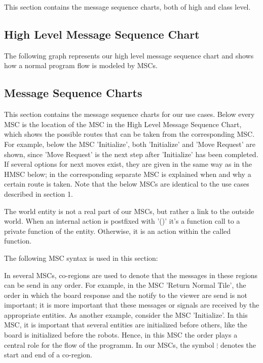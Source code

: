 This section contains the message sequence charts, both of high and class level.
\subsection{High Level Message Sequence Chart}
	
	\begin{minipage}{\linewidth}
		The following graph represents our high level message sequence chart and shows how a normal program flow is modeled by MSCs.
		
			
	\end{minipage}
	\newpage
\subsection{Message Sequence Charts}
	This section contains the message sequence charts for our use cases. Below every MSC is the location of the MSC in the High Level Message Sequence Chart, which shows the possible routes that can be taken from the corresponding MSC. For example, below the MSC 'Initialize', both 'Initialize' and 'Move Request' are shown, since 'Move Request' is the next step after 'Initialize' has been completed. If several options for next moves exist, they are given in the same way as in the HMSC below; in the corresponding separate MSC is explained when and why a certain route is taken. Note that the below MSCs are identical to the use cases described in section 1.

	The world entity is not a real part of our MSCs, but rather a link to the outside world. When an internal action is postfixed with '()' it's a function call to a private function of the entity. Otherwise, it is an action within the called function.

	The following MSC syntax is used in this section:

	

	In several MSCs, co-regions are used to denote that the messages in these regions can be send in any order. For example, in the MSC 'Return Normal Tile', the order in which the board response and the notify to the viewer are send is not important; it is more important that these messages or signals are received by the appropriate entities. As another example, consider the MSC 'Initialize'. In this MSC, it is important that several entities are initialized before others, like the board is initialized before the robots. Hence, in this MSC the order plays a central role for the flow of the programm. In our MSCs, the symbol $\vdots$ denotes the start and end of a co-region.

